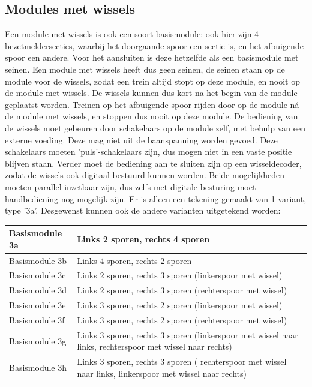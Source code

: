 \documentclass[12pt,a4paper]{report}
\begin{document}
\subsection{Modules met wissels}
Een module met wissels is ook een soort basismodule: ook hier zijn 4 bezetmeldersecties, waarbij het doorgaande spoor een sectie is, en het afbuigende spoor een andere. Voor het aansluiten is deze hetzelfde als een basismodule met seinen.
Een module met wissels heeft dus geen seinen, de seinen staan op de module voor de wissels, zodat een trein altijd stopt op deze module, en nooit op de module met wissels. De wissels kunnen dus kort na het begin van de module geplaatst worden.
Treinen op het afbuigende spoor rijden door op de module n\'{a} de module met wissels, en stoppen dus nooit op deze module.
De bediening van de wissels moet gebeuren door schakelaars op de module zelf, met behulp van een externe voeding. Deze mag niet uit de baanspanning worden gevoed. Deze schakelaars moeten 'puls'-schakelaars zijn, dus mogen niet in een vaste positie blijven staan.
Verder moet de bediening aan te sluiten zijn op een wisseldecoder, zodat de wissels ook digitaal bestuurd kunnen worden. Beide mogelijkheden moeten parallel inzetbaar zijn, dus zelfs met digitale besturing moet handbediening nog mogelijk zijn.
Er is alleen een tekening gemaakt van 1 variant, type '3a'. Desgewenst kunnen ook de andere varianten uitgetekend worden:

\begin{tabular}{| l | p{14cm} |}
\hline
Basismodule 3a&Links 2 sporen, rechts 4 sporen\\
\hline
Basismodule 3b&Links 4 sporen, rechts 2 sporen\\
\hline
Basismodule 3c&Links 2 sporen, rechts 3 sporen (linkerspoor met wissel)\\
\hline
Basismodule 3d&Links 2 sporen, rechts 3 sporen (rechterspoor met wissel)\\
\hline
Basismodule 3e&Links 3 sporen, rechts 2 sporen (linkerspoor met wissel)\\
\hline
Basismodule 3f&Links 3 sporen, rechts 2 sporen (rechterspoor met wissel)\\
\hline
Basismodule 3g&Links 3 sporen, rechts 3 sporen (linkerspoor met wissel naar links, rechterspoor met wissel naar rechts)\\
\hline
Basismodule 3h&Links 3 sporen, rechts 3 sporen ( rechterspoor met wissel naar links, linkerspoor met wissel naar rechts)\\
\hline
\end{tabular}
\end{document}
